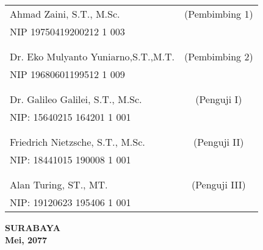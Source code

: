    \noindent
    \begin{tabularx}{\textwidth}{X c}
      Ahmad Zaini, S.T., M.Sc.          & (Pembimbing 1) \\
      NIP 19750419200212 1 003        & \\
      &  \\
      &  \\
      Dr. Eko Mulyanto Yuniarno,S.T.,M.T.& (Pembimbing 2) \\
      NIP 19680601199512 1 009        & \\
      &  \\
      &  \\
      Dr. Galileo Galilei, S.T., M.Sc.  & (Penguji I) \\
      NIP: 15640215 164201 1 001        & \\
      &  \\
      &  \\
      Friedrich Nietzsche, S.T., M.Sc.  & (Penguji II) \\
      NIP: 18441015 190008 1 001        & \\
      &  \\
      &  \\
      Alan Turing, ST., MT.             & (Penguji III) \\
      NIP: 19120623 195406 1 001        & \\
    \end{tabularx}
  \endgroup

  \vspace{4ex}

  \begin{center}
    \textbf{SURABAYA} \\
    \textbf{Mei, 2077}
  \end{center}
\endgroup
